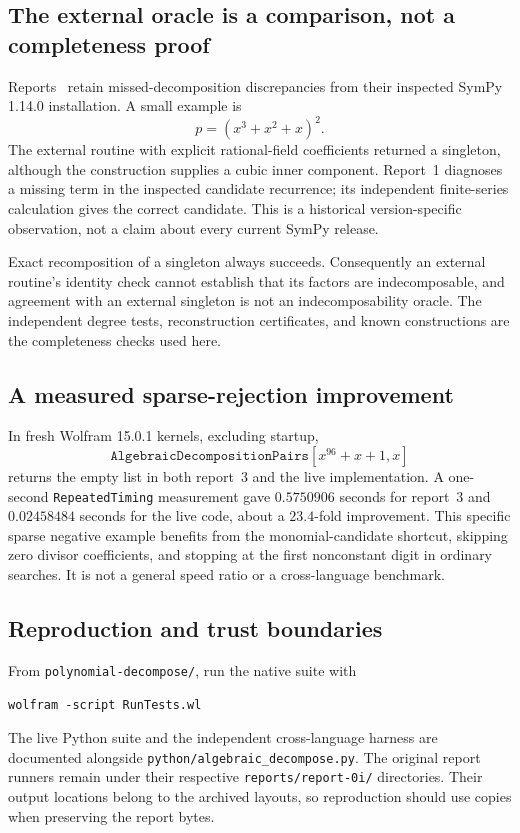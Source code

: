 \documentclass[11pt,a4paper]{article}
\numberwithin{equation}{section}
\theoremstyle{definition}
\theoremstyle{remark}
\newcommand{\code}[1]{\texttt{#1}}
\begin{document}
\subsection{The external oracle is a comparison, not a completeness proof}
Reports~\cite{r1,r3} retain missed-decomposition discrepancies from their
inspected SymPy 1.14.0 installation.  A small example is
\[
 p=(x^3+x^2+x)^2.
\]
The external routine with explicit rational-field coefficients returned a
singleton, although the construction supplies a cubic inner component.
Report~1 diagnoses a missing term in the inspected candidate recurrence;
its independent finite-series calculation gives the correct candidate.
This is a historical version-specific observation, not a claim about every
current SymPy release.

Exact recomposition of a singleton always succeeds.  Consequently an external
routine's identity check cannot establish that its factors are indecomposable,
and agreement with an external singleton is not an indecomposability oracle.
The independent degree tests, reconstruction certificates, and known
constructions are the completeness checks used here.

\subsection{A measured sparse-rejection improvement}
In fresh Wolfram 15.0.1 kernels, excluding startup,
\[
 \code{AlgebraicDecompositionPairs}[x^{96}+x+1,x]
\]
returns the empty list in both report~3 and the live implementation.
A one-second \code{RepeatedTiming} measurement gave \(0.5750906\) seconds
for report~3 and \(0.02458484\) seconds for the live code, about a
\(23.4\)-fold improvement.  This specific sparse negative example benefits
from the monomial-candidate shortcut, skipping zero divisor coefficients,
and stopping at the first nonconstant digit in ordinary searches.
It is not a general speed ratio or a cross-language benchmark.

\subsection{Reproduction and trust boundaries}
From \code{polynomial-decompose/}, run the native suite with
\begin{lstlisting}
wolfram -script RunTests.wl
\end{lstlisting}
The live Python suite and the independent cross-language harness are
documented alongside \code{python/algebraic\_decompose.py}.  The original
report runners remain under their respective \code{reports/report-0i/}
directories.  Their output locations belong to the archived layouts, so
reproduction should use copies when preserving the report bytes.
\end{document}
